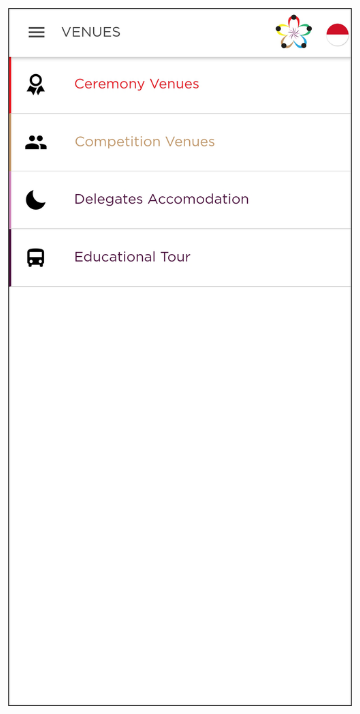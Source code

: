 \begin{figure}[H]
     \centering
     \begin{subfigure}[b]{0.21\textwidth}
        \centering
	    \includegraphics[scale=0.4]{Gambar/VenuePage.png}

\end{subfigure}
\end{figure}
